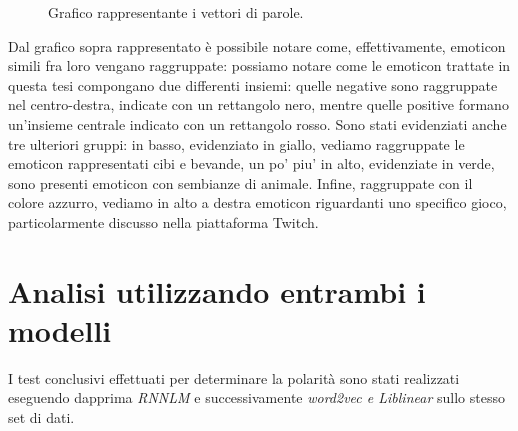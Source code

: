\documentclass[a4paper,12pt,openright,twoside]{report}
\theoremstyle{definition}
\begin{document}
\begin{figure}[H]
	\centering
	\caption{Grafico rappresentante i vettori di parole.}
	\label{fig:tSNE}
\end{figure}

Dal grafico sopra rappresentato è possibile notare come, effettivamente, emoticon simili fra loro vengano raggruppate:
possiamo notare come le emoticon trattate in questa tesi compongano due differenti insiemi: quelle negative sono raggruppate nel centro-destra, indicate con un rettangolo nero, mentre quelle positive formano un'insieme centrale indicato con un rettangolo rosso.
Sono stati evidenziati anche tre ulteriori gruppi: in basso, evidenziato in giallo, vediamo raggruppate le emoticon rappresentati cibi e bevande,
un po' piu' in alto, evidenziate in verde, sono presenti emoticon con sembianze di animale. Infine, raggruppate con il colore azzurro, vediamo in alto a destra emoticon riguardanti uno specifico gioco, particolarmente discusso nella piattaforma Twitch.


\section{Analisi utilizzando entrambi i modelli}
I test conclusivi effettuati per determinare la polarità
sono stati realizzati eseguendo dapprima \emph{RNNLM} e successivamente \emph{word2vec e Liblinear} sullo stesso set di dati.
\end{document}
